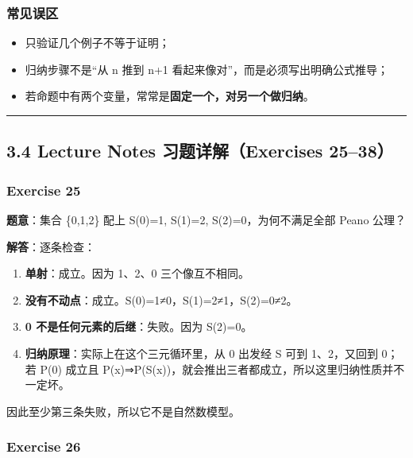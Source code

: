 \documentclass[
  11pt,
]{article}
\providecommand{\tightlist}{%
  \setlength{\itemsep}{0pt}\setlength{\parskip}{0pt}}
\begin{document}
\subsubsection{常见误区}\label{ux5e38ux89c1ux8befux533a}

\begin{itemize}
\tightlist
\item
  只验证几个例子不等于证明；
\item
  归纳步骤不是``从 n 推到 n+1 看起来像对''，而是必须写出明确公式推导；
\item
  若命题中有两个变量，常常是\textbf{固定一个，对另一个做归纳}。
\end{itemize}

\begin{center}\rule{0.5\linewidth}{0.5pt}\end{center}

\subsection{3.4 Lecture Notes 习题详解（Exercises
25--38）}\label{lecture-notes-ux4e60ux9898ux8be6ux89e3exercises-2538}

\subsubsection{Exercise 25}\label{exercise-25}

\textbf{题意}：集合 \{0,1,2\} 配上 S(0)=1, S(1)=2,
S(2)=0，为何不满足全部 Peano 公理？

\textbf{解答}：逐条检查：

\begin{enumerate}
\def\labelenumi{\arabic{enumi}.}
\tightlist
\item
  \textbf{单射}：成立。因为 1、2、0 三个像互不相同。
\item
  \textbf{没有不动点}：成立。S(0)=1≠0，S(1)=2≠1，S(2)=0≠2。
\item
  \textbf{0 不是任何元素的后继}：失败。因为 S(2)=0。
\item
  \textbf{归纳原理}：实际上在这个三元循环里，从 0 出发经 S 可到
  1、2，又回到 0；若 P(0) 成立且
  P(x)⇒P(S(x))，就会推出三者都成立，所以这里归纳性质并不一定坏。
\end{enumerate}

因此至少第三条失败，所以它不是自然数模型。

\subsubsection{Exercise 26}\label{exercise-26}
\end{document}

